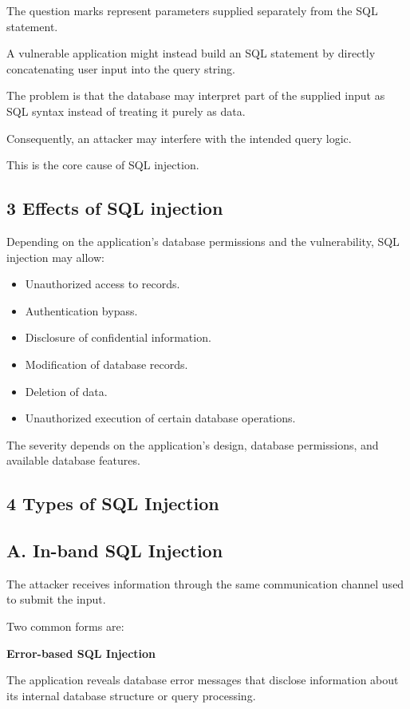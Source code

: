 The question marks represent parameters supplied separately from the SQL statement.

A vulnerable application might instead build an SQL statement by directly concatenating user input into the query string.

The problem is that the database may interpret part of the supplied input as SQL syntax instead of treating it purely as data.

Consequently, an attacker may interfere with the intended query logic.

This is the core cause of SQL injection.

\subsection{3 Effects of SQL injection}

Depending on the application's database permissions and the vulnerability, SQL injection may allow:

\begin{itemize}
\item Unauthorized access to records.
\item Authentication bypass.
\item Disclosure of confidential information.
\item Modification of database records.
\item Deletion of data.
\item Unauthorized execution of certain database operations.
\end{itemize}

The severity depends on the application's design, database permissions, and available database features.

\subsection{4 Types of SQL Injection}

\subsection{A. In-band SQL Injection}

The attacker receives information through the same communication channel used to submit the input.

Two common forms are:

\textbf{Error-based SQL Injection}

The application reveals database error messages that disclose information about its internal database structure or query processing.

